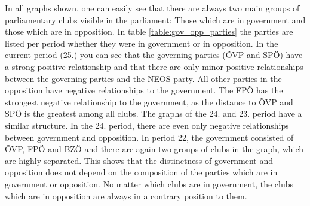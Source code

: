 In all graphs shown, one can easily see that there are always two main groups of parliamentary clubs visible in the parliament: Those which are in government and those which are in opposition. In table \ref{table:gov_opp_parties} the parties are listed per period whether they were in government or in opposition. 
In the current period (25.) you can see that the governing parties (ÖVP and SPÖ) have a strong positive relationship and that there are only minor positive relationships between the governing parties and the NEOS party. All other parties in the opposition have negative relationships to the government. The FPÖ has the strongest negative relationship to the government, as the distance to ÖVP and SPÖ is the greatest among all clubs. The graphs of the 24. and 23. period have a similar structure. In the 24. period, there are even only negative relationships between government and opposition. In period 22, the government consisted of ÖVP, FPÖ and BZÖ and there are again two groups of clubs in the graph, which are highly separated. This shows that the distinctness of government and opposition does not depend on the composition of the parties which are in government or opposition. No matter which clubs are in government, the clubs which are in opposition are always in a contrary position to them.


